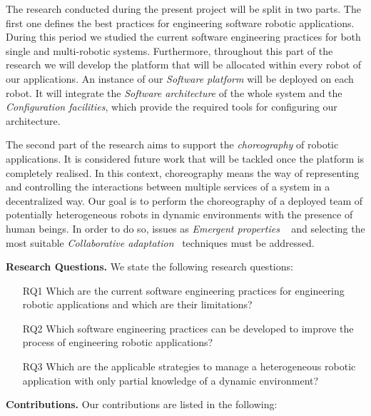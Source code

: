 The research conducted during the present project will be split in two parts.
The first one defines the best practices for engineering software robotic applications.
During this period we studied the current software engineering practices for both single and multi-robotic systems.
Furthermore, throughout this part of the research we will develop the platform that will be allocated within every robot of our applications.
An instance of our \emph{Software platform} will be deployed on each robot.
It will integrate the \emph{Software architecture} of the whole system and  the \emph{Configuration facilities}, which provide the required tools for configuring our architecture.%

The second part of the research aims to support the \emph{choreography} of robotic applications.
It is considered future work that will be tackled once the platform is completely realised.
In this context, choreography means the way of representing and controlling the interactions between multiple services of a system in a decentralized way.
Our goal is to perform the choreography of a deployed team of potentially heterogeneous robots in dynamic environments with the presence of human beings.
In order to do so, issues as \emph{Emergent properties} ~\cite{DeAngelis2016} and selecting the most suitable \emph{Collaborative adaptation}~\cite{Yan2013} techniques must be addressed.

\textbf{Research Questions.} 
We state the following research questions:
\begin{itemize}
\item[RQ1] Which are the current software engineering practices for engineering robotic applications and which are their limitations?
\item[RQ2] Which software engineering practices can be developed to improve the process of engineering robotic applications?
\item[RQ3] Which are the applicable strategies to manage a heterogeneous robotic application with only partial knowledge of a dynamic environment?
\end{itemize}

\textbf{Contributions.} 
Our contributions are listed in the following:

